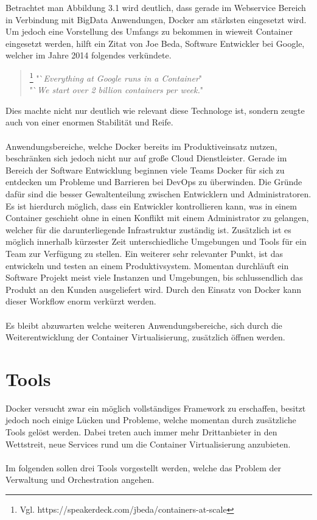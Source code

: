 \documentclass[12pt,toc=bib,toc=listof]{scrreprt}
\begin{document}
Betrachtet man Abbildung 3.1 wird deutlich, dass gerade im Webservice Bereich in Verbindung mit BigData Anwendungen, Docker am stärksten eingesetzt wird.
Um jedoch eine Vorstellung des Umfangs zu bekommen in wieweit Container eingesetzt werden, hilft ein Zitat von Joe Beda, Software Entwickler bei Google, welcher im Jahre 2014 folgendes verkündete.
\begin{quote}
	\footnote[2]{Vgl. https://speakerdeck.com/jbeda/containers-at-scale}
	"`\textit{Everything at Google runs in a Container}"\\
	"`\textit{We start over 2 billion containers per week.}"
\end{quote}
Dies machte nicht nur deutlich wie relevant diese Technologe ist, sondern zeugte auch von einer enormen Stabilität und Reife.\\
\\
Anwendungsbereiche, welche Docker bereits im Produktiveinsatz nutzen, beschränken sich jedoch nicht nur auf große Cloud Dienstleister.
Gerade im Bereich der Software Entwicklung beginnen viele Teams Docker für sich zu entdecken um Probleme und Barrieren bei DevOps zu überwinden.
Die Gründe dafür sind die besser Gewaltenteilung zwischen Entwicklern und Administratoren.
Es ist hierdurch möglich, dass ein Entwickler kontrollieren kann, was in einem Container geschieht ohne in einen Konflikt mit einem Administrator zu gelangen, welcher für die darunterliegende Infrastruktur zuständig ist. 
Zusätzlich ist es möglich innerhalb kürzester Zeit unterschiedliche Umgebungen und Tools für ein Team zur Verfügung zu stellen.
Ein weiterer sehr relevanter Punkt, ist das entwickeln und testen an einem Produktivsystem. Momentan durchläuft ein Software Projekt meist viele Instanzen und Umgebungen, bis schlussendlich das Produkt an den Kunden ausgeliefert wird. Durch den Einsatz von Docker kann dieser Workflow enorm verkürzt werden.\\
\\
Es bleibt abzuwarten welche weiteren Anwendungsbereiche, sich durch die Weiterentwicklung der Container Virtualisierung, zusätzlich öffnen werden.

\section{Tools}
Docker versucht zwar ein möglich vollständiges Framework zu erschaffen, besitzt jedoch noch einige Lücken und Probleme, welche momentan durch zusätzliche Tools gelöst werden.
Dabei treten auch immer mehr Drittanbieter in den Wettstreit, neue Services rund um die Container Virtualisierung anzubieten.\\
\\
Im folgenden sollen drei Tools vorgestellt werden, welche das Problem der Verwaltung und Orchestration angehen.
\end{document}
